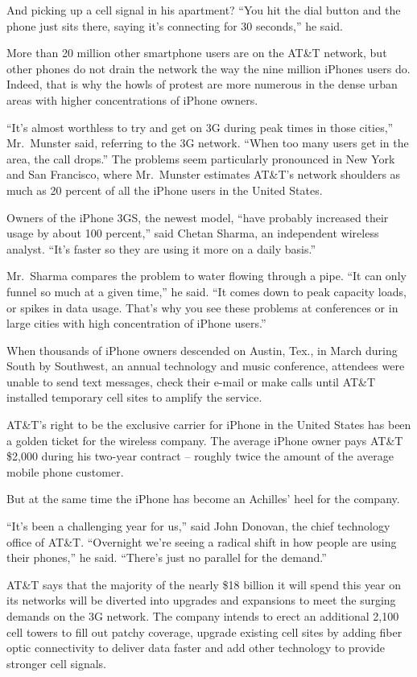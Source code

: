 ﻿\documentclass[12pt]{article}
\begin{document}
And picking up a cell signal in his apartment? ``You hit the dial button and the phone just sits
there, saying it's connecting for 30 seconds,'' he said.

More than 20 million other smartphone users are on the AT\&T network, but other phones do not drain
the network the way the nine million iPhones users do. Indeed, that is why the howls of protest are
more numerous in the dense urban areas with higher concentrations of iPhone owners.

``It's almost worthless to try and get on 3G during peak times in those cities,'' Mr.~Munster said,
referring to the 3G network. ``When too many users get in the area, the call drops.'' The problems
seem particularly pronounced in New York and San Francisco, where Mr.~Munster estimates AT\&T's
network shoulders as much as 20 percent of all the iPhone users in the United States.

Owners of the iPhone 3GS, the newest model, ``have probably increased their usage by about 100
percent,'' said Chetan Sharma, an independent wireless analyst. ``It's faster so they are using it
more on a daily basis.''

Mr.~Sharma compares the problem to water flowing through a pipe. ``It can only funnel so much at a
given time,'' he said. ``It comes down to peak capacity loads, or spikes in data usage. That's why
you see these problems at conferences or in large cities with high concentration of iPhone users.''

When thousands of iPhone owners descended on Austin, Tex., in March during South by Southwest, an
annual technology and music conference, attendees were unable to send text messages, check their
e-mail or make calls until AT\&T installed temporary cell sites to amplify the service.

AT\&T's right to be the exclusive carrier for iPhone in the United States has been a golden ticket
for the wireless company. The average iPhone owner pays AT\&T \$2,000 during his two-year contract
-- roughly twice the amount of the average mobile phone customer.

But at the same time the iPhone has become an Achilles' heel for the company.

``It's been a challenging year for us,'' said John Donovan, the chief technology office of AT\&T.
``Overnight we're seeing a radical shift in how people are using their phones,'' he said. ``There's
just no parallel for the demand.''

AT\&T says that the majority of the nearly \$18 billion it will spend this year on its networks will
be diverted into upgrades and expansions to meet the surging demands on the 3G network. The company
intends to erect an additional 2,100 cell towers to fill out patchy coverage, upgrade existing cell
sites by adding fiber optic connectivity to deliver data faster and add other technology to provide
stronger cell signals.
\end{document}
